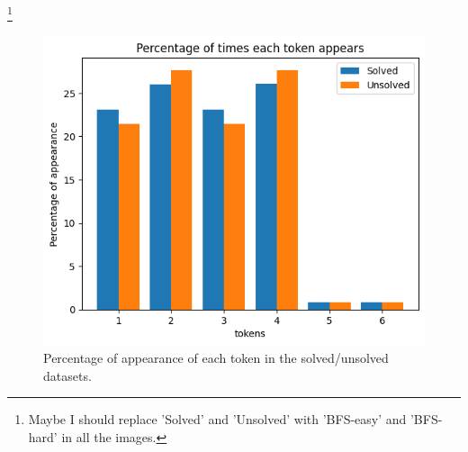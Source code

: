 \footnote{Maybe I should replace 'Solved' and 'Unsolved' with 'BFS-easy' and 'BFS-hard' in all the images.}

\begin{figure}
	\centering
	\includegraphics[scale=0.6]{fig/tokens_hist.png}
	\caption{Percentage of appearance of each token in the solved/unsolved datasets.}
	\label{fig:tokens_hist}
\end{figure}

